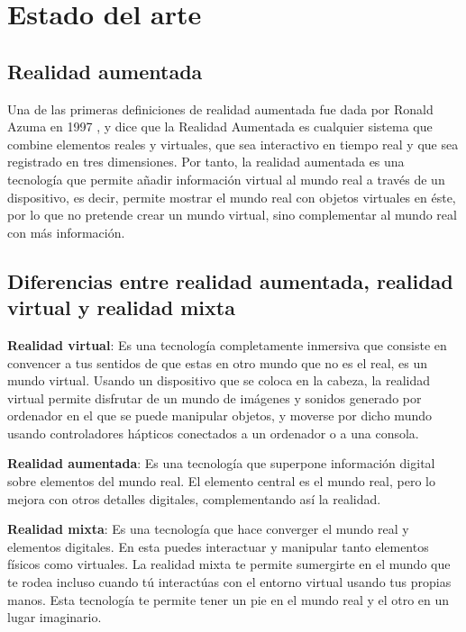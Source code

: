 \chapter{Estado del arte}
\label{ch:estado}

\section{Realidad aumentada}
Una de las primeras definiciones de realidad aumentada fue dada por Ronald Azuma en 1997 \cite{azuma}, y dice que la Realidad Aumentada es cualquier sistema que combine elementos reales y virtuales, que sea interactivo en tiempo real y que sea registrado en tres dimensiones. Por tanto, la realidad aumentada es una tecnología que permite añadir información virtual al mundo real a través de un dispositivo, es decir, permite mostrar el mundo real con objetos virtuales en éste, por lo que no pretende crear un mundo virtual, sino complementar al mundo real con más información.

\section{Diferencias entre realidad aumentada, realidad virtual y realidad mixta}
\textbf{Realidad virtual}: Es una tecnología completamente inmersiva que consiste en convencer a tus sentidos de que estas en otro mundo que no es el real, es un mundo virtual. Usando un dispositivo que se coloca en la cabeza, la realidad virtual permite disfrutar de un mundo de imágenes y sonidos generado por ordenador en el que se puede manipular objetos, y moverse por dicho mundo usando controladores hápticos conectados a un ordenador o a una consola. \cite{intel}

\textbf{Realidad aumentada}: Es una tecnología que superpone información digital sobre elementos del mundo real. El elemento central es el mundo real, pero lo mejora con otros detalles digitales, complementando así la realidad. \cite{intel}

\textbf{Realidad mixta}: Es una tecnología que hace converger el mundo real y elementos digitales. En esta puedes interactuar y manipular tanto elementos físicos como virtuales. La realidad mixta te permite sumergirte en el mundo que te rodea incluso cuando tú interactúas con el entorno virtual usando tus propias manos. Esta tecnología te permite tener un pie en el mundo real y el otro en un lugar imaginario. \cite{intel}

